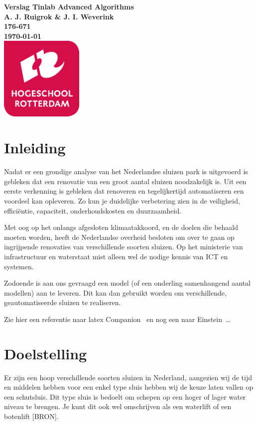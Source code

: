 \documentclass{article}
\begin{document}
\graphicspath{{../Images/}}
\sffamily
\begin{titlepage}
  \centering
    \vfill
    {\bfseries\Huge
      Verslag Tinlab Advanced Algorithms \\
        \vskip2cm
      }
      {\bfseries\Large
        A. J. Ruigrok \& J. I. Weverink\\
      }
      {
        \bfseries\normalsize
        176-671\\
        \vskip1cm
        \today\\
    }
    \vfill
    \includegraphics[width=4cm]{logohr.png} %
    \vfill
    \vfill
\end{titlepage}
\newpage
\tableofcontents

\newpage
\section{Inleiding}
Nadat er een grondige analyse van het Nederlandse sluizen park is uitgevoerd is gebleken dat een renovatie van een groot aantal sluizen noodzakelijk is. Uit een eerste verkenning is gebleken dat renoveren en tegelijkertijd automatiseren een voordeel kan opleveren. Zo kun je duidelijke verbetering zien in de veiligheid, efficiëntie, capaciteit, onderhoudskosten en duurzaamheid.

Met oog op het onlangs afgesloten klimaatakkoord, en de doelen die behaald moeten worden, heeft de Nederlandse overheid besloten om over te gaan op ingrijpende renovaties van verschillende soorten sluizen. Op het ministerie van infrastructuur en waterstaat mist alleen wel de nodige kennis van ICT en systemen.

Zodoende is aan ons gevraagd een model (of een onderling samenhangend aantal modellen) aan te leveren. Dit kan dan gebruikt worden om verschillende, geautomatiseerde sluizen te realiseren.

Zie hier een referentie naar latex Companion~\cite{latexcompanion} en nog een naar Einstein~\cite{einstein}\ldots 

\clearpage

\section{Doelstelling}
Er zijn een hoop verschillende soorten sluizen in Nederland, aangezien wij de tijd en middelen hebben voor een enkel type sluis hebben wij de keuze laten vallen op een schutsluis. Dit type sluis is bedoelt om schepen op een hoger of lager water niveau te brengen. Je kunt dit ook wel omschrijven als een waterlift of een botenlift [BRON].
\end{document}

